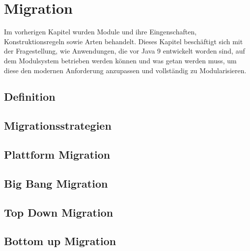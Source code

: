 \section{Migration}
Im vorherigen Kapitel wurden Module und ihre Eingenschaften, Konstruktionsregeln sowie Arten behandelt. 
Dieses Kapitel beschäftigt sich mit der Fragestellung, wie Anwendungen, die vor Java 9 entwickelt worden sind, auf dem Modulsystem betrieben werden können und was getan werden muss, um diese den modernen Anforderung anzupassen und vollständig zu Modularisieren.


\subsection{Definition}

\subsection{Migrationsstrategien}

\subsection{Plattform Migration}

\subsection{Big Bang Migration}

\subsection{Top Down Migration}

\subsection{Bottom up Migration}


